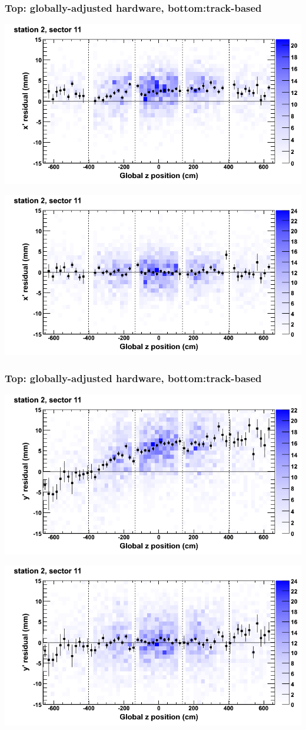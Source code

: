 \documentclass[compress]{beamer}
\begin{document}
\begin{frame}
\frametitle{Top: globally-adjusted hardware, bottom:track-based}
\includegraphics[width=0.7\linewidth]{NOV4_mapplots_HW/DTvsz_st2sec11_x.png}

\includegraphics[width=0.7\linewidth]{NOV4_mapplots/DTvsz_st2sec11_x.png}
\end{frame}

\begin{frame}
\frametitle{Top: globally-adjusted hardware, bottom:track-based}
\includegraphics[width=0.7\linewidth]{NOV4_mapplots_HW/DTvsz_st2sec11_y.png}

\includegraphics[width=0.7\linewidth]{NOV4_mapplots/DTvsz_st2sec11_y.png}
\end{frame}
\end{document}
